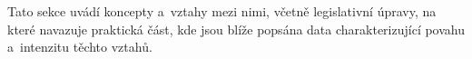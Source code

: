 
Tato sekce uvádí koncepty a~vztahy mezi nimi, včetně legislativní úpravy, na které navazuje praktická část, kde jsou blíže popsána data charakterizující povahu a~intenzitu těchto vztahů.\par

